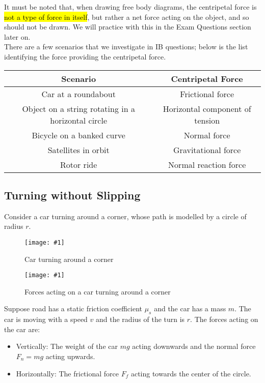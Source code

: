\documentclass[a4paper,12pt]{article}
\newcommand{\lb}{\\[8pt]}
\newcommand{\img}[4]{\begin{center}
  \begin{figure}[H]
    \centering
    \texttt{[image: \#1]}
    \caption{#3}
    \label{fig:#4}
  \end{figure}
\end{center}}
\begin{document}
It must be noted that, when drawing free body diagrams, the centripetal force is \hl{not a type of force in itself}, but rather a net force acting on the object, and so should not be drawn. We will practice with this in the Exam Questions section later on.\lb
There are a few scenarios that we investigate in IB questions; below is the list identifying the force providing the centripetal force.
\begin{table}[H]
  \centering
  \begin{tabular}{|c|c|}
    \hline
    \rowcolor{BlueGreen!35!white}
    \textbf{Scenario}                                  & \textbf{Centripetal Force}      \\ \hline
    Car at a roundabout                                & Frictional force                \\
    Object on a string rotating in a horizontal circle & Horizontal component of tension \\
    Bicycle on a banked curve                          & Normal force                    \\
    Satellites in orbit                                & Gravitational force             \\
    Rotor ride                                         & Normal reaction force           \\\hline
  \end{tabular}
\end{table}

\pagebreak


\subsection{Turning without Slipping}

Consider a car turning around a corner, whose path is modelled by a circle of radius $r$.

\begin{minipage}{0.35\textwidth}
  \centering
  \img{material/turn1.png}{1}{Car turning around a corner}{carturn}
\end{minipage}\hspace{0.1\textwidth}%
\begin{minipage}{0.55\textwidth}
  \centering
  \img{material/turn2.png}{1}{Forces acting on a car turning around a corner}{carturnforces}
\end{minipage}


Suppose road has a static friction coefficient $\mu_s$ and the car has a mass $m$. The car is moving with a speed $v$ and the radius of the turn is $r$. The forces acting on the car are:
\begin{itemize}
  \item Vertically: The weight of the car $mg$ acting downwards and the normal force $F_n = mg$ acting upwards.
  \item Horizontally: The frictional force $F_f$ acting towards the center of the circle.
\end{itemize}
\end{document}
